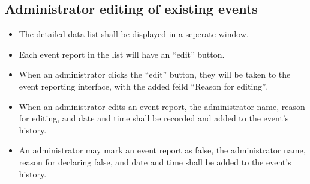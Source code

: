 \subsection{Administrator editing of existing events}
\begin{itemize}
\item The detailed data list shall be displayed in a seperate window.
\item Each event report in the list will have an ``edit'' button.
\item When an administrator clicks the ``edit'' button, they will be taken to the event reporting interface, with the added feild ``Reason for editing''.
\item When an administrator edits an event report, the administrator name, reason for editing, and date and time shall be recorded and added to the event's history.
\item An administrator may mark an event report as false, the administrator name, reason for declaring false, and date and time shall be added to the event's history.
\end{itemize}

